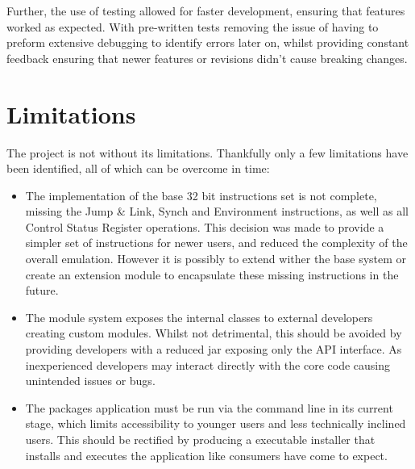 Further, the use of testing allowed for faster development, ensuring that features worked as expected. With pre-written tests removing the issue of having to preform extensive debugging to identify errors later on, whilst providing constant feedback ensuring that newer features or revisions didn't cause breaking changes.

\section{Limitations}
The project is not without its limitations. Thankfully only a few limitations have been identified, all of which can be overcome in time:
\begin{itemize}
    \item The implementation of the base 32 bit instructions set is not complete, missing the Jump \& Link, Synch and Environment instructions, as well as all Control Status Register operations. This decision was made to provide a simpler set of instructions for newer users, and reduced the complexity of the overall emulation. However it is possibly to extend wither the base system or create an extension module to encapsulate these missing instructions in the future.

    \item The module system exposes the internal classes to external developers creating custom modules. Whilst not detrimental, this should be avoided by providing developers with a reduced jar exposing only the API interface. As inexperienced developers may interact directly with the core code causing unintended issues or bugs.

    \item The packages application must be run via the command line in its current stage, which limits accessibility to younger users and less technically inclined users. This should be rectified by producing a executable installer that installs and executes the application like consumers have come to expect.
\end{itemize}





